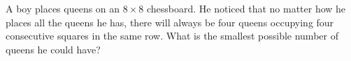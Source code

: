 A boy places queens on an $8\times8$ chessboard. He noticed that no matter how he places all the queens he has, there will always be four queens occupying four consecutive squares in the same row. What is the smallest possible number of queens he could have?
